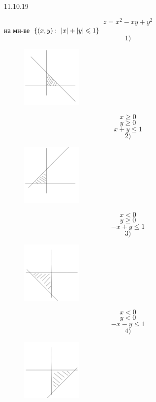 \documentclass[matan.tex]{subfiles}
\begin{document}
\begin{lect} {11.10.19}
        \begin{Task}[1]
            \[z = x^2 - xy + y^2\]
            на мн-ве\ $\{(x, y) : \ \left|x\right| + \left|y\right| \leqslant 1\}$
            \[1)\]
            \begin{figure}[H]
                \includegraphics[width=3cm]{pics/2}
                \centering
            \end{figure}
            \[x \geq 0\]
            \[y \geq 0\]
            \[x + y \leq 1\] 
            \[2)\]
            \begin{figure}[H]
                \includegraphics[width=3cm]{pics/3}
                \centering
            \end{figure}
            \[x < 0\]
            \[y \geq 0\]
            \[-x + y \leq 1\]
            \[3)\]
            \begin{figure}[H]
                \includegraphics[width=3cm]{pics/4}
                \centering
            \end{figure}
            \[x < 0\]
            \[y < 0\]
            \[-x - y \leq 1\]
            \[4)\]
            \begin{figure}[H]
                \includegraphics[width=3cm]{pics/5}
                \centering

\end{figure}
\end{Task}
\end{lect}
\end{document}
